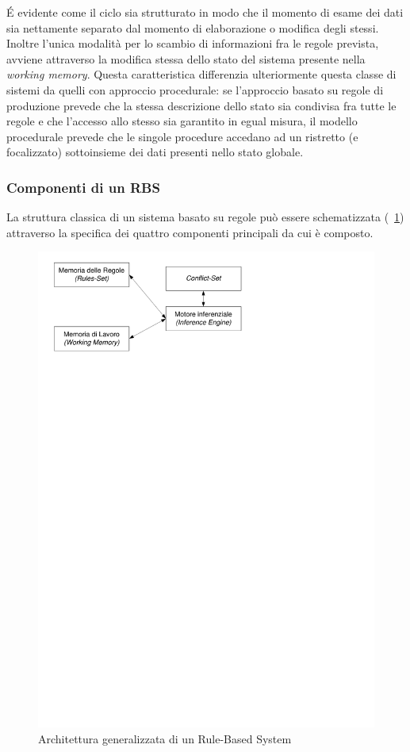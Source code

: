 \'E evidente come il ciclo sia strutturato in modo che il momento di esame dei dati sia nettamente separato dal momento di elaborazione o modifica degli stessi. Inoltre l'unica modalità per lo scambio di informazioni fra le regole prevista, avviene attraverso la modifica stessa dello stato del sistema presente nella \emph{working memory}. Questa caratteristica differenzia ulteriormente questa classe di sistemi da quelli con approccio procedurale: se l'approccio basato su regole di produzione prevede che la stessa descrizione dello stato sia condivisa fra tutte le regole e che l'accesso allo stesso sia garantito in egual misura, il modello procedurale prevede che le singole procedure accedano ad un ristretto (e focalizzato) sottoinsieme dei dati presenti nello stato globale.

\subsubsection{Componenti di un RBS}


La struttura classica di un sistema basato su regole può essere schematizzata (\figurename~\ref{fig:architettura-rbs}) attraverso la specifica dei quattro componenti principali da cui è composto.

\begin{figure}[h]
\centering
\includegraphics[viewport=28 667 361 824]{Immagini/Capitolo2/Architettura-RBS.pdf}
\caption{Architettura generalizzata di un Rule-Based System}\label{fig:architettura-rbs}
\end{figure}

